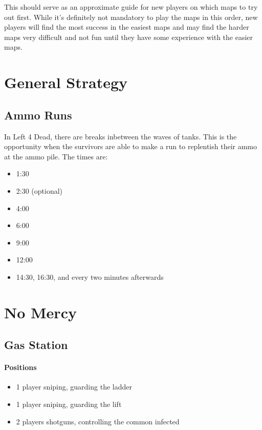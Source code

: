 This should serve as an approximate guide for new players on which maps to try out first. While it's definitely not mandatory to play the maps in this order, new players will find the most success in the easiest maps and may find the harder maps very difficult and not fun until they have some experience with the easier maps.

\section{General Strategy}

\subsection{Ammo Runs}
In Left 4 Dead, there are breaks inbetween the waves of tanks. This is the opportunity when the survivors are able to make a run to replentish their ammo at the ammo pile. The times are:
\begin{itemize}
\item 1:30
\item 2:30 (optional)
\item 4:00
\item 6:00
\item 9:00
\item 12:00
\item 14:30, 16:30, and every two minutes afterwards
\end{itemize}

\section{No Mercy}

\subsection{Gas Station}
\paragraph{Positions}
\begin{itemize}
\item 1 player sniping, guarding the ladder
\item 1 player sniping, guarding the lift
\item 2 players shotguns, controlling the common infected
\end{itemize}

